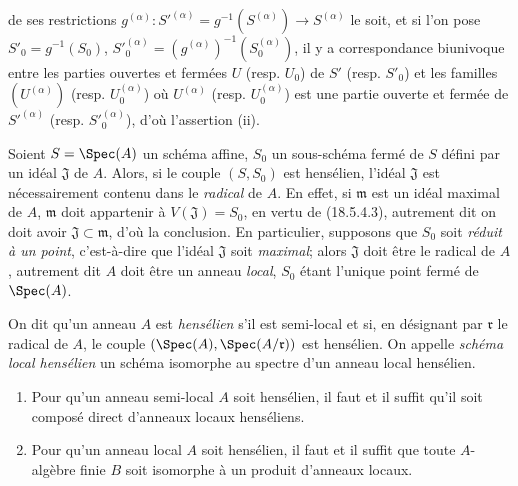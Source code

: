 
de ses restrictions $g^{(\alpha)}:S'^{(\alpha)}=g^{-1}(S^{(\alpha)})\to S^{(\alpha)}$ le soit, et si l'on pose $S'_0=g^{-1}(S_0)$, $S'^{(\alpha)}_0=(g^{(\alpha)})^{-1}(S^{(\alpha)}_0)$, il y a correspondance biunivoque entre les parties ouvertes et fermées $U$ (resp. $U_0$) de $S'$ (resp. $S'_0$) et les familles $(U^{(\alpha)})$ (resp. $U^{(\alpha)}_0$) où $U^{(\alpha)}$ (resp. $U^{(\alpha)}_0$) est une partie ouverte et fermée de $S'^{(\alpha)}$ (resp. $S'^{(\alpha)}_0$), d'où l'assertion (ii).

\begin{remark}[18.5.7]
\label{IV.18.5.7}
Soient $S=\Spec(A)$ un schéma affine, $S_0$ un sous-schéma fermé de $S$ défini par un idéal $\mathfrak J$ de $A$. Alors, si le couple $(S,S_0)$ est hensélien, l'idéal $\mathfrak J$ est nécessairement contenu dans le \emph{radical} de $A$. En effet, si $\mathfrak m$ est un idéal maximal de $A$, $\mathfrak m$ doit appartenir à $V(\mathfrak J)=S_0$, en vertu de (18.5.4.3), autrement dit on doit avoir $\mathfrak J\subset\mathfrak m$, d'où la conclusion. En particulier, supposons que $S_0$ soit \emph{réduit à un point}, c'est-à-dire que l'idéal $\mathfrak J$ soit \emph{maximal}; alors $\mathfrak J$ doit être le radical de $A$, autrement dit $A$ doit être un anneau \emph{local}, $S_0$ étant l'unique point fermé de $\Spec(A)$.
\end{remark}

\begin{definition}[18.5.8]
On dit qu'un anneau $A$ est \emph{hensélien} s'il est semi-local et si, en désignant par $\mathfrak r$ le radical de $A$, le couple $(\Spec(A),\Spec(A/\mathfrak r))$ est hensélien. On appelle \emph{schéma local hensélien} un schéma isomorphe au spectre d'un anneau local hensélien.
\end{definition}

\begin{proposition}[18.5.9]
\label{IV.18.5.9}
\begin{enumerate}
  \item[(i)] Pour qu'un anneau semi-local $A$ soit hensélien, il faut et il suffit qu'il soit composé direct d'anneaux locaux henséliens.
  \item[(ii)] Pour qu'un anneau local $A$ soit hensélien, il faut et il suffit que toute $A$-algèbre finie $B$ soit isomorphe à un produit d'anneaux locaux.
\end{enumerate}
\end{proposition}

